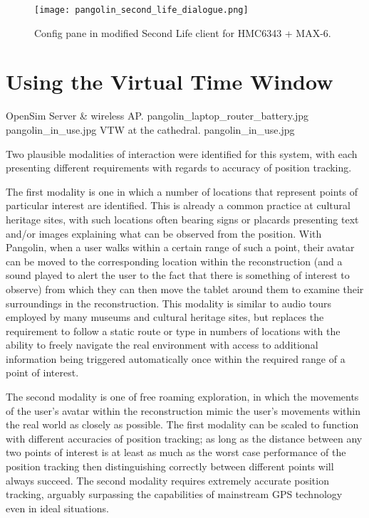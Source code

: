 \begin{figure}[h]
\centering
  \texttt{[image: pangolin\_second\_life\_dialogue.png]}
  \caption{Config pane in modified Second Life client for HMC6343 + MAX-6.}
  \label{pangolin_second_life_dialogue.png}
\end{figure}


\section{Using the Virtual Time Window}

 {OpenSim Server \& wireless AP.} {pangolin_laptop_router_battery.jpg}
       {pangolin_in_use.jpg} {VTW at the cathedral.} {pangolin_in_use.jpg}

Two plausible modalities of interaction were identified for this system, with each presenting different requirements with regards to accuracy of position tracking.

The first modality is one in which a number of locations that represent points of particular interest are identified. This is already a common practice at cultural heritage sites, with such locations often bearing signs or placards presenting text and/or images explaining what can be observed from the position. With Pangolin, when a user walks within a certain range of such a point, their avatar can be moved to the corresponding location within the reconstruction (and a sound played to alert the user to the fact that there is something of interest to observe) from which they can then move the tablet around them to examine their surroundings in the reconstruction. This modality is similar to audio tours employed by many museums and cultural heritage sites, but replaces the requirement to follow a static route or type in numbers of locations with the ability to freely navigate the real environment with access to additional information being triggered automatically once within the required range of a point of interest.

The second modality is one of free roaming exploration, in which the movements of the user's avatar within the reconstruction mimic the user's movements within the real world as closely as possible.
The first modality can be scaled to function with different accuracies of position tracking; as long as the distance between any two points of interest is at least as much as the worst case performance of the position tracking then distinguishing correctly between different points will always succeed. The second modality requires extremely accurate position tracking, arguably surpassing the capabilities of mainstream GPS technology even in ideal situations.

